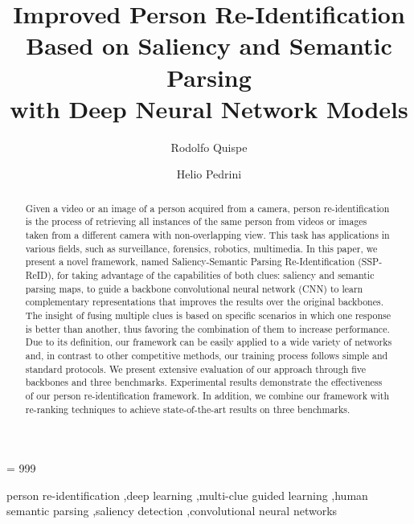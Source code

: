 \documentclass[final,3p,times,twocolumn]{elsarticle}
\begin{document}
\sloppy
\tolerance = 999

\newlength{\figw}
\newlength{\figh}

\begin{frontmatter}





\title{Improved Person Re-Identification Based on Saliency and Semantic Parsing \\ with Deep Neural Network Models}



\author[institute1]{Rodolfo Quispe}
\author[institute1]{Helio Pedrini}
\address[institute1]{Institute of Computing, University of Campinas, Campinas, SP, Brazil, 13083-852}

\begin{abstract}
Given a video or an image of a person acquired from a camera, person re-identification is the process of retrieving all instances of the same person from videos or images taken from a different camera with non-overlapping view. This task has applications in various fields, such as surveillance, forensics, robotics, multimedia. In this paper, we present a novel framework, named Saliency-Semantic Parsing Re-Identification (SSP-ReID), for taking advantage of the capabilities of both clues: saliency and semantic parsing maps, to guide a backbone convolutional neural network (CNN) to learn complementary representations that improves the results over the original backbones. The insight of fusing multiple clues is based on specific scenarios in which one response is better than another, thus favoring the combination of them to increase performance. Due to its definition, our framework can be easily applied to a wide variety of networks and, in contrast to other competitive methods, our training process follows simple and standard protocols. We present extensive evaluation of our approach through five backbones and three benchmarks. Experimental results demonstrate the effectiveness of our person re-identification framework. In addition, we combine our framework with re-ranking techniques to achieve state-of-the-art results on three benchmarks.
\end{abstract}
 
\begin{keyword}
person re-identification \sep deep learning \sep multi-clue guided learning \sep human semantic parsing \sep saliency detection \sep convolutional neural networks



\end{keyword}

\end{frontmatter}
\end{document}
